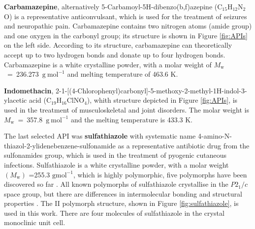 \newpage
\textbf{Carbamazepine}, alternatively 5-Carbamoyl-5H-dibenzo(b,f)azepine (C$_{15}$H$_{12}$N$_{2}$O) is a representative anticonvulsant, which is used for the treatment of seizures and neuropathic pain. Carbamazepine contains two nitrogen atoms (amide group) and one oxygen in the carbonyl group; its structure is shown in Figure \ref{fig:APIs} on the left side. According to its structure, carbamazepine can theoretically accept up to two hydrogen bonds and donate up to four hydrogen bonds. Carbamazepine is a white crystalline powder, with a molar weight of $M_\mathrm{w}$~=~236.273~$\mathrm{g\ mol^{-1}}$ and melting temperature of 463.6 K. \cite{stejfa_heat_2021}

\textbf{Indomethacin}, 2-{1-[(4-Chlorophenyl)carbonyl]-5-methoxy-2-methyl-1H-indol-3-yl}acetic acid (C$_{19}$H$_{16}$ClNO$_{4}$), whith structure depicted in Figure \ref{fig:APIs}, is used in the treatment of musculoskeletal and joint disorders. The molar weight is $M_\mathrm{w}$~=~357.8~$\mathrm{g\ mol^{-1}}$ and the melting temperature is 433.3 K. \cite{stejfa_heat_2021}



The last selected API was \textbf{sulfathiazole} with systematic name 4-amino-N-thiazol-2-ylidenebenzene-sulfonamide as a representative antibiotic drug from the sulfonamides group, which is used in the treatment of pyogenic cutaneous infections. Sulfathiazole is a white crystalline powder, with a molar weight $(M_\mathrm{w})$ =255.3 $\mathrm{gmol^{-1}}$, which is highly polymorphic, five polymorphs have been discovered so far \cite{caron_comparison_2011}. All known polymorphs of sulfathiazole crystallise in the $P2_1/c$ space group, but there are differences in intermolecular bonding and structural properties \cite{drebushchak_crystal_2008}. The II polymorph structure, shown in Figure \ref{fig:sulfathiazole}, is used in this work. There are four molecules of sulfathiazole in the crystal monoclinic unit cell. 

